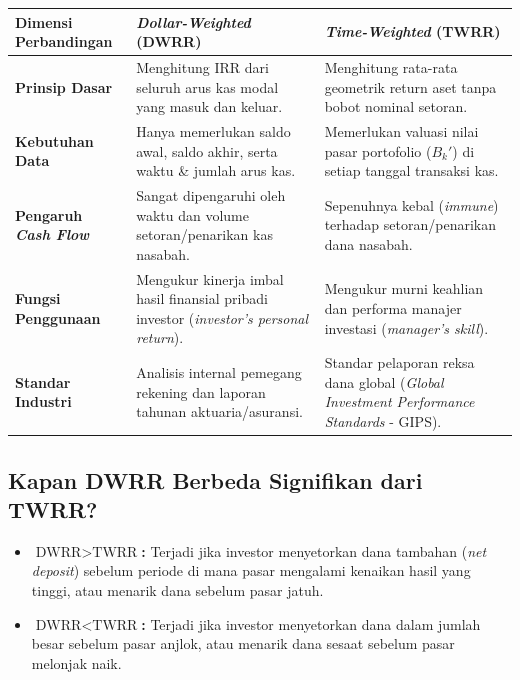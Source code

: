 \documentclass[11pt,a4paper]{article}
\begin{document}
\begin{center}
\small
\renewcommand{\arraystretch}{1.35}
\begin{tabular}{p{3.2cm}p{5.4cm}p{5.4cm}}
\toprule
\textbf{Dimensi Perbandingan} & \textbf{\textit{Dollar-Weighted} (DWRR)} & \textbf{\textit{Time-Weighted} (TWRR)} \\
\midrule
\textbf{Prinsip Dasar} & Menghitung IRR dari seluruh arus kas modal yang masuk dan keluar. & Menghitung rata-rata geometrik return aset tanpa bobot nominal setoran. \\
\textbf{Kebutuhan Data} & Hanya memerlukan saldo awal, saldo akhir, serta waktu \& jumlah arus kas. & Memerlukan valuasi nilai pasar portofolio ($B_k'$) di setiap tanggal transaksi kas. \\
\textbf{Pengaruh \textit{Cash Flow}} & Sangat dipengaruhi oleh waktu dan volume setoran/penarikan kas nasabah. & Sepenuhnya kebal (\textit{immune}) terhadap setoran/penarikan dana nasabah. \\
\textbf{Fungsi Penggunaan} & Mengukur kinerja imbal hasil finansial pribadi investor (\textit{investor's personal return}). & Mengukur murni keahlian dan performa manajer investasi (\textit{manager's skill}). \\
\textbf{Standar Industri} & Analisis internal pemegang rekening dan laporan tahunan aktuaria/asuransi. & Standar pelaporan reksa dana global (\textit{Global Investment Performance Standards} - GIPS). \\
\bottomrule
\end{tabular}
\end{center}

\subsection{Kapan DWRR Berbeda Signifikan dari TWRR?}

\begin{notebox}
\begin{itemize}[leftmargin=1.5em]
    \item \textbf{$\text{DWRR} > \text{TWRR}$:} Terjadi jika investor menyetorkan dana tambahan (\textit{net deposit}) sebelum periode di mana pasar mengalami kenaikan hasil yang tinggi, atau menarik dana sebelum pasar jatuh.
    \item \textbf{$\text{DWRR} < \text{TWRR}$:} Terjadi jika investor menyetorkan dana dalam jumlah besar sebelum pasar anjlok, atau menarik dana sesaat sebelum pasar melonjak naik.
\end{itemize}
\end{notebox}
\end{document}
